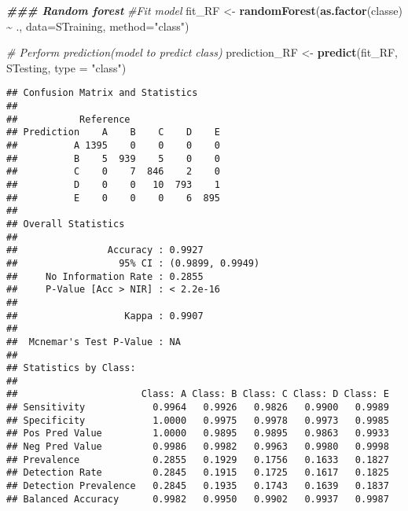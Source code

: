 \documentclass[
]{article}
\newenvironment{Shaded}{\begin{snugshade}}{\end{snugshade}}
\newcommand{\AttributeTok}[1]{\textcolor[rgb]{0.13,0.29,0.53}{#1}}
\newcommand{\CommentTok}[1]{\textcolor[rgb]{0.56,0.35,0.01}{\textit{#1}}}
\newcommand{\DocumentationTok}[1]{\textcolor[rgb]{0.56,0.35,0.01}{\textbf{\textit{#1}}}}
\newcommand{\FunctionTok}[1]{\textcolor[rgb]{0.13,0.29,0.53}{\textbf{#1}}}
\newcommand{\NormalTok}[1]{#1}
\newcommand{\OtherTok}[1]{\textcolor[rgb]{0.56,0.35,0.01}{#1}}
\newcommand{\SpecialCharTok}[1]{\textcolor[rgb]{0.81,0.36,0.00}{\textbf{#1}}}
\newcommand{\StringTok}[1]{\textcolor[rgb]{0.31,0.60,0.02}{#1}}
\begin{document}
\begin{Shaded}
\begin{Highlighting}[]
\DocumentationTok{\#\#\# Random forest}
\CommentTok{\#Fit model }
\NormalTok{fit\_RF }\OtherTok{\textless{}{-}} \FunctionTok{randomForest}\NormalTok{(}\FunctionTok{as.factor}\NormalTok{(classe) }\SpecialCharTok{\textasciitilde{}}\NormalTok{ ., }\AttributeTok{data=}\NormalTok{STraining, }\AttributeTok{method=}\StringTok{"class"}\NormalTok{)}

\CommentTok{\# Perform prediction(model to predict class)}
\NormalTok{prediction\_RF }\OtherTok{\textless{}{-}} \FunctionTok{predict}\NormalTok{(fit\_RF, STesting, }\AttributeTok{type =} \StringTok{"class"}\NormalTok{)}
\end{Highlighting}
\end{Shaded}

\begin{Shaded}
\end{Shaded}

\begin{verbatim}
## Confusion Matrix and Statistics
## 
##           Reference
## Prediction    A    B    C    D    E
##          A 1395    0    0    0    0
##          B    5  939    5    0    0
##          C    0    7  846    2    0
##          D    0    0   10  793    1
##          E    0    0    0    6  895
## 
## Overall Statistics
##                                           
##                Accuracy : 0.9927          
##                  95% CI : (0.9899, 0.9949)
##     No Information Rate : 0.2855          
##     P-Value [Acc > NIR] : < 2.2e-16       
##                                           
##                   Kappa : 0.9907          
##                                           
##  Mcnemar's Test P-Value : NA              
## 
## Statistics by Class:
## 
##                      Class: A Class: B Class: C Class: D Class: E
## Sensitivity            0.9964   0.9926   0.9826   0.9900   0.9989
## Specificity            1.0000   0.9975   0.9978   0.9973   0.9985
## Pos Pred Value         1.0000   0.9895   0.9895   0.9863   0.9933
## Neg Pred Value         0.9986   0.9982   0.9963   0.9980   0.9998
## Prevalence             0.2855   0.1929   0.1756   0.1633   0.1827
## Detection Rate         0.2845   0.1915   0.1725   0.1617   0.1825
## Detection Prevalence   0.2845   0.1935   0.1743   0.1639   0.1837
## Balanced Accuracy      0.9982   0.9950   0.9902   0.9937   0.9987
\end{verbatim}
\end{document}
